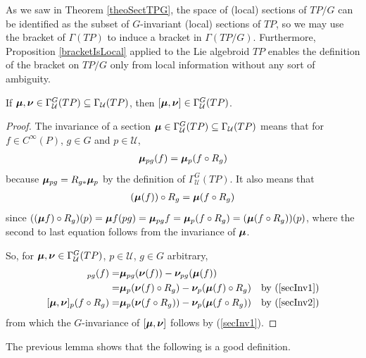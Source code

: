 As we saw in Theorem \ref{theoSectTPG}, the space of (local) sections of $TP/G$ can be identified as the subset of $G$-invariant (local) sections of $TP$, so we may use the bracket of $\Gamma(TP)$ to induce a bracket in $\Gamma(TP/G)$. Furthermore, Proposition \ref{bracketIsLocal} applied to the Lie algebroid $TP$ enables the definition of the bracket on $TP/G$ only from local information without any sort of ambiguity.

\begin{lemma}
If $\bm{\mu}, \bm{\nu} \in \Gamma_{\mathcal U}^G(TP) \subseteq \Gamma_{\mathcal U}(TP)$, then $[\bm{\mu}, \bm{\nu}] \in \Gamma_{\mathcal U}^G(TP)$.
\end{lemma}

\begin{proof}
The invariance of a section $\bm{\mu} \in \Gamma_{\mathcal U}^G(TP) \subseteq \Gamma_{\mathcal U}(TP)$ means that for $f \in C^\infty(P)$, $g \in G$ and $p \in \mathcal U$,  
\begin{align} \label{secInv1}
\bm{\mu}_{pg} (f) = \bm{\mu}_p(f \circ R_g)\end{align} 
because $\bm{\mu}_{pg} = R_{g*} \bm{\mu}_p$ by the definition of $\Gamma_{\mathcal U}^G(TP)$. It also means that 
\begin{align}\label{secInv2}
(\bm{\mu} (f)) \circ R_g = \bm{\mu}(f \circ R_g)
\end{align}
since $((\bm{\mu} f) \circ R_g)(p) = \bm{\mu} f(pg) = \bm{\mu}_{pg} f = \bm{\mu}_p(f \circ R_g) = (\bm{\mu}(f \circ R_g))(p)$, where the second to last equation follows from the invariance of $\bm{\mu}$.
    
So, for $\bm{\mu}, \bm{\nu} \in \Gamma_{\mathcal U}^G(TP)$, $p \in \mathcal U$, $g \in G$ arbitrary,
\begin{align*}
    [\sect \mu, \sect \nu]_{pg}(f)
        =& \sect \mu_{pg}(\sect \nu(f)) - \sect \nu_{pg}(\sect \mu (f))\\
        =& \sect \mu_{p}(\sect \nu(f) \circ R_g) - \sect \nu_{p}(\sect \mu (f) \circ R_g) & \textrm{by } (\ref{secInv1})\\
    [\sect \mu, \sect \nu]_p (f \circ R_g) =& \sect \mu_p(\sect \nu(f \circ R_g)) - \sect \nu_p(\sect \mu(f \circ R_g)) & \textrm{by } (\ref{secInv2})
\end{align*}
from which the $G$-invariance of $[\bm{\mu}, \bm{\nu}]$ follows by (\ref{secInv1}).
\end{proof}

The previous lemma shows that the following is a good definition.


